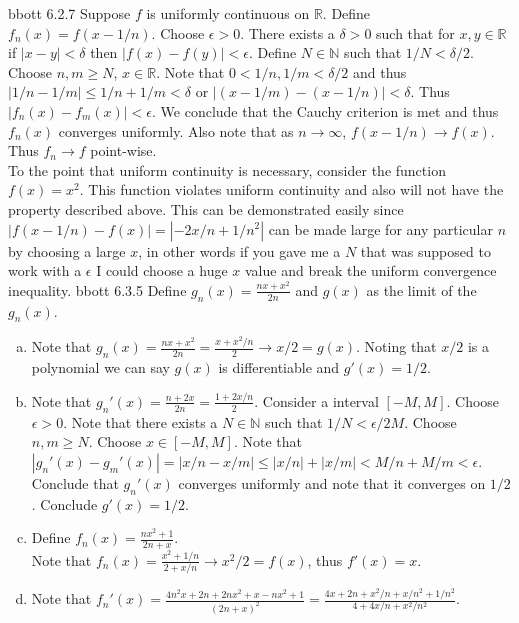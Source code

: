 \documentclass[12pt]{article}
\makeatletter
\theoremstyle{homework}
\newenvironment{exercise}[1]
{\def\@currentlabel{#1}\exercisecore}
{\endexercisecore}
\makeatother
\begin{document}
\begin{exercise}

Abbott 6.2.7
\end{exercise}
Suppose $f$ is uniformly continuous on $\mathbb{R}$.  Define $f_n(x)=f(x-1/n)$.  Choose $\epsilon>0$.  There exists a $\delta>0$ such that for $x,y\in\mathbb{R}$ if $|x-y|<\delta$ then $|f(x)-f(y)|<\epsilon$.  Define $N\in\mathbb{N}$ such that $1/N<\delta/2$.  Choose $n,m\geq N$, $x\in\mathbb{R}$.  Note that $0<1/n,1/m<\delta/2$ and thus $|1/n-1/m|\leq 1/n+1/m<\delta$ or $|(x-1/m)-(x-1/n)|<\delta$.  Thus $|f_n(x)-f_m(x)|<\epsilon$.  We conclude that the Cauchy criterion is met and thus $f_n(x)$ converges uniformly.  Also note that as $n\rightarrow\infty$, $f(x-1/n)\rightarrow f(x)$.  Thus $f_n\rightarrow f$ point-wise.\\
To the point that uniform continuity is necessary, consider the function $f(x)=x^2$.  This function violates uniform continuity and also will not have the property described above.  This can be demonstrated easily since $|f(x-1/n)-f(x)|=|-2x/n+1/n^2|$ can be made large for any particular $n$ by choosing a large $x$, in other words if you gave me a $N$ that was supposed to work with a $\epsilon$ I could choose a huge $x$ value and break the uniform convergence inequality.
\begin{exercise}

Abbott 6.3.5
\end{exercise}
Define $g_n(x)=\frac{nx+x^2}{2n}$ and $g(x)$ as the limit of the $g_n(x)$.
\begin{enumerate}[(a)]
\item
Note that $g_n(x)=\frac{nx+x^2}{2n}=\frac{x+x^2/n}{2}\rightarrow x/2=g(x)$.  Noting that $x/2$ is a polynomial we can say $g(x)$ is differentiable and $g'(x)=1/2$.
\item
Note that $g_n'(x)=\frac{n+2x}{2n}=\frac{1+2x/n}{2}$.  Consider a interval $[-M,M]$.  Choose $\epsilon>0$.  Note that there exists a $N\in\mathbb{N}$ such that $1/N<\epsilon/2M$.  Choose $n,m\geq N$.  Choose $x\in[-M,M]$.  Note that $|g_n'(x)-g_m'(x)|=|x/n-x/m|\leq |x/n|+|x/m|<M/n+M/m<\epsilon$.  Conclude that $g_n'(x)$ converges uniformly and note that it converges on $1/2$.  Conclude $g'(x)=1/2$.
\item
Define $f_n(x)=\frac{nx^2+1}{2n+x}$.\\
Note that $f_n(x)=\frac{x^2+1/n}{2+x/n}\rightarrow x^2/2=f(x)$, thus $f'(x)=x$.
\item
Note that $f_n'(x)=\frac{4n^2x+2n+2nx^2+x-nx^2+1}{(2n+x)^2}=\frac{4x+2n+x^2/n+x/n^2+1/n^2}{4+4x/n+x^2/n^2}$.
\end{enumerate}
\end{document}
